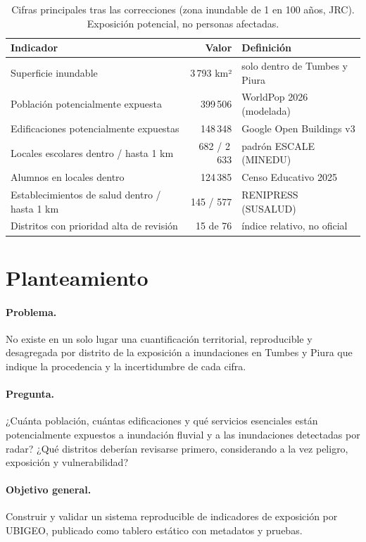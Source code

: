 \documentclass[11pt,a4paper]{article}
\begin{document}
\begin{table}[H]\centering\small
\caption{Cifras principales tras las correcciones (zona inundable de 1 en 100 años, JRC). Exposición potencial, no personas afectadas.}
\begin{tabular}{lrl}\toprule
Indicador & Valor & Definición \\\midrule
Superficie inundable & 3\,793 km² & solo dentro de Tumbes y Piura \\
Población potencialmente expuesta & 399\,506 & WorldPop 2026 (modelada) \\
Edificaciones potencialmente expuestas & 148\,348 & Google Open Buildings v3 \\
Locales escolares dentro / hasta 1 km & 682 / 2\,633 & padrón ESCALE (MINEDU) \\
Alumnos en locales dentro & 124\,385 & Censo Educativo 2025 \\
Establecimientos de salud dentro / hasta 1 km & 145 / 577 & RENIPRESS (SUSALUD) \\
Distritos con prioridad alta de revisión & 15 de 76 & índice relativo, no oficial \\\bottomrule
\end{tabular}
\end{table}

\section{Planteamiento}

\paragraph{Problema.} No existe en un solo lugar una cuantificación territorial, reproducible y desagregada por distrito de la exposición a inundaciones en Tumbes y Piura que indique la procedencia y la incertidumbre de cada cifra.

\paragraph{Pregunta.} ¿Cuánta población, cuántas edificaciones y qué servicios esenciales están potencialmente expuestos a inundación fluvial y a las inundaciones detectadas por radar? ¿Qué distritos deberían revisarse primero, considerando a la vez peligro, exposición y vulnerabilidad?

\paragraph{Objetivo general.} Construir y validar un sistema reproducible de indicadores de exposición por UBIGEO, publicado como tablero estático con metadatos y pruebas.
\end{document}
